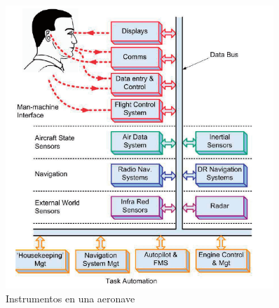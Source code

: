 \begin{figure}[!htb]
  \centering
  \includegraphics[width=0.9\textwidth]{01.tablero.instrumentos/U01.imagenes/1.2.clasificacion.instrumentos/tipos_instrumentos.png}  
  \caption{Instrumentos en una aeronave \protect\cite{Introduction_to_Avionics_Systems}}
  \label{fig:01.instrumentos.en.una.aeronave}
\end{figure}







